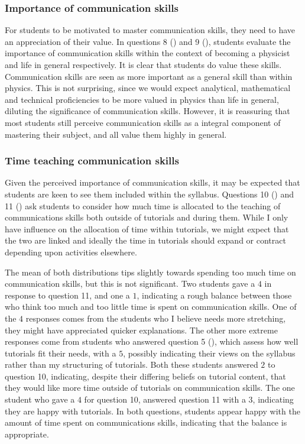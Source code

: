\subsubsection{Importance of communication skills}\label{sec:comm-value}

For students to be motivated to master communication skills, they need to have an appreciation of their value. In questions 8 () and 9 (), students evaluate the importance of communication skills within the context of becoming a physicist and life in general respectively. It is clear that students do value these skills. Communication skills are seen as more important as a general skill than within physics. This is not surprising, since we would expect analytical, mathematical and technical proficiencies to be more valued in physics than life in general, diluting the significance of communication skills. However, it is reassuring that most students still perceive communication skills as a integral component of mastering their subject, and all value them highly in general.

\subsubsection{Time teaching communication skills}\label{sec:comm-time}

Given the perceived importance of communication skills, it may be expected that students are keen to see them included within the syllabus. Questions 10 () and 11 () ask students to consider how much time is allocated to the teaching of communications skills both outside of tutorials and during them. While I only have influence on the allocation of time within tutorials, we might expect that the two are linked and ideally the time in tutorials should expand or contract depending upon activities elsewhere.

The mean of both distributions tips slightly towards spending too much time on communication skills, but this is not significant. Two students gave a $4$ in response to question 11, and one a $1$, indicating a rough balance between those who think too much and too little time is spent on communication skills. One of the $4$ responses comes from the students who I believe needs more stretching, they might have appreciated quicker explanations. The other more extreme responses come from students who answered question 5 (), which assess how well tutorials fit their needs, with a $5$, possibly indicating their views on the syllabus rather than my structuring of tutorials. Both these students answered $2$ to question 10, indicating, despite their differing beliefs on tutorial content, that they would like more time outside of tutorials on communication skills. The one student who gave a $4$ for question 10, answered question 11 with a $3$, indicating they are happy with tutorials. In both questions, students appear happy with the amount of time spent on communications skills, indicating that the balance is appropriate.

